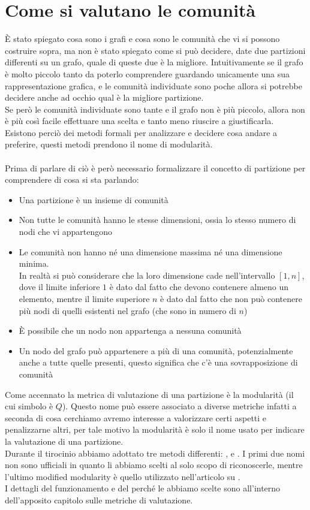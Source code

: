 \section{Come si valutano le comunità}
È stato spiegato cosa sono i grafi e cosa sono le comunità che vi si possono costruire sopra, ma non è stato spiegato come si può decidere, date due partizioni differenti su un grafo, quale di queste due è la migliore. Intuitivamente se il grafo è molto piccolo tanto da poterlo comprendere guardando unicamente una sua rappresentazione grafica, e le comunità individuate sono poche allora si potrebbe decidere anche ad occhio qual è la migliore partizione.\\
Se però le comunità individuate sono tante e il grafo non è più piccolo, allora non è più così facile effettuare una scelta e tanto meno riuscire a giustificarla. Esistono perciò dei metodi formali per analizzare e decidere cosa andare a preferire, questi metodi prendono il nome di modularità.\\
\\
Prima di parlare di ciò è però necessario formalizzare il concetto di partizione per comprendere di cosa si sta parlando:
\begin{itemize}
	\item Una partizione è un insieme di comunità
	\item Non tutte le comunità hanno le stesse dimensioni, ossia lo stesso numero di nodi che vi appartengono
	\item Le comunità non hanno né una dimensione massima né una dimensione minima.\\
	In realtà si può considerare che la loro dimensione cade nell'intervallo $[1, n]$, dove il limite inferiore $1$ è dato dal fatto che devono contenere almeno un elemento, mentre il limite superiore $n$ è dato dal fatto che non può contenere più nodi di quelli esistenti nel grafo (che sono in numero di $n$)
	\item È possibile che un nodo non appartenga a nessuna comunità
	\item Un nodo del grafo può appartenere a più di una comunità, potenzialmente anche a tutte quelle presenti, questo significa che c'è una sovrapposizione di comunità
\end{itemize}
Come accennato la metrica di valutazione di una partizione è la modularità (il cui simbolo è $Q$). Questo nome può essere associato a diverse metriche infatti a seconda di cosa cerchiamo avremo interesse a valorizzare certi aspetti e penalizzarne altri, per tale motivo la modularità è solo il nome usato per indicare la valutazione di una partizione.\\
Durante il tirocinio abbiamo adottato tre metodi differenti: \mmax, \mover e \mmod. I primi due nomi non sono ufficiali in quanto li abbiamo scelti al solo scopo di riconoscerle, mentre l'ultimo modified modularity  è quello utilizzato nell'articolo su \cnrl .\\
I dettagli del funzionamento e del perché le abbiamo scelte sono all'interno dell'apposito capitolo sulle metriche di valutazione.
%
